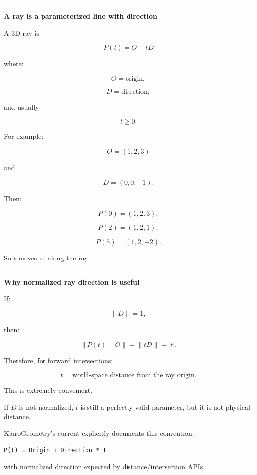 \hypertarget{04-visual-computing-ii-ch028-rays-as-geometric-visibility-queries}{}

\begin{center}\rule{0.5\linewidth}{0.5pt}\end{center}

\textbf{A ray is a parameterized line with direction}

A 3D ray is

\[
\boxed{
P(t)=O+tD
}
\]

where:

\[
O=\text{origin},
\]

\[
D=\text{direction},
\]

and usually

\[
t\ge0.
\]

For example:

\[
O=(1,2,3)
\]

and

\[
D=(0,0,-1).
\]

Then:

\[
P(0)=(1,2,3),
\]

\[
P(2)=(1,2,1),
\]

\[
P(5)=(1,2,-2).
\]

So \(t\) moves us along the ray.

\begin{center}\rule{0.5\linewidth}{0.5pt}\end{center}

\textbf{Why normalized ray direction is useful}

If:

\[
\|D\|=1,
\]

then:

\[
\|P(t)-O\|
=
\|tD\|
=
|t|.
\]

Therefore, for forward intersections:

\[
\boxed{t=\text{world-space distance from the ray origin}.}
\]

This is extremely convenient.

If \(D\) is not normalized, \(t\) is still a perfectly valid parameter, but it is not physical distance.

KairoGeometry's current  explicitly documents this convention:

\begin{verbatim}
P(t) = Origin + Direction * t
\end{verbatim}

with normalized direction expected by distance/intersection APIs.

